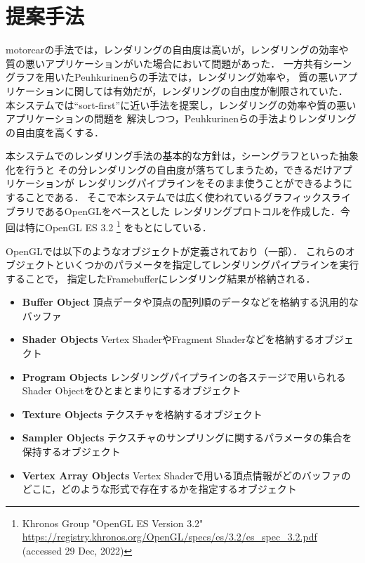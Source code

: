 \section{提案手法}

motorcarの手法では，レンダリングの自由度は高いが，レンダリングの効率や
質の悪いアプリケーションがいた場合において問題があった．
一方共有シーングラフを用いたPeuhkurinenらの手法では，レンダリング効率や，
質の悪いアプリケーションに関しては有効だが，レンダリングの自由度が制限されていた．
本システムでは``sort-first''に近い手法を提案し，レンダリングの効率や質の悪いアプリケーションの問題を
解決しつつ，Peuhkurinenらの手法よりレンダリングの自由度を高くする．

本システムでのレンダリング手法の基本的な方針は，シーングラフといった抽象化を行うと
その分レンダリングの自由度が落ちてしまうため，できるだけアプリケーションが
レンダリングパイプラインをそのまま使うことができるようにすることである．
そこで本システムでは広く使われているグラフィックスライブラリであるOpenGLをベースとした
レンダリングプロトコルを作成した．今回は特にOpenGL ES 3.2
\footnote{Khronos Group "OpenGL ES Version 3.2" \url{https://registry.khronos.org/OpenGL/specs/es/3.2/es_spec_3.2.pdf} (accessed 29 Dec, 2022)}
をもとにしている．

OpenGLでは以下のようなオブジェクトが定義されており（一部）．
これらのオブジェクトといくつかのパラメータを指定してレンダリングパイプラインを実行することで，
指定したFramebufferにレンダリング結果が格納される．
\begin{itemize}
  \item \textbf{Buffer Object} 頂点データや頂点の配列順のデータなどを格納する汎用的なバッファ
  \item \textbf{Shader Objects} Vertex ShaderやFragment Shaderなどを格納するオブジェクト
  \item \textbf{Program Objects} レンダリングパイプラインの各ステージで用いられるShader Objectをひとまとまりにするオブジェクト
  \item \textbf{Texture Objects} テクスチャを格納するオブジェクト
  \item \textbf{Sampler Objects} テクスチャのサンプリングに関するパラメータの集合を保持するオブジェクト
  \item \textbf{Vertex Array Objects}
        Vertex Shaderで用いる頂点情報がどのバッファのどこに，どのような形式で存在するかを指定するオブジェクト
\end{itemize}

